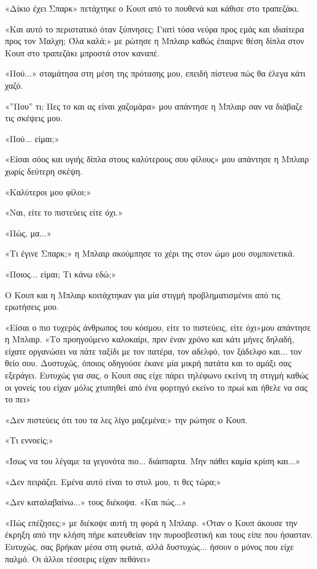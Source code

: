 \documentclass[12pt,twoside, openany]{book}
\begin{document}
«Δίκιο έχει Σπαρκ» πετάχτηκε ο Κουπ από το πουθενά και κάθισε στο τραπεζάκι.

«Και αυτό το περιστατικό όταν ξύπνησες; Γιατί τόσα νεύρα προς εμάς και ιδιαίτερα προς τον Μαλχη; Όλα καλά;» με ρώτησε η Μπλαιρ καθώς έπαιρνε θέση δίπλα στον Κουπ στο τραπεζάκι μπροστά στον καναπέ.

«Πού...» σταμάτησα στη μέση της πρότασης μου, επειδή πίστευα πώς θα έλεγα κάτι χαζό.

«”Που” τι; Πες το και ας είναι χαζομάρα» μου απάντησε η Μπλαιρ σαν να διάβαζε τις σκέψεις μου.

«Πού... είμαι;»

«Είσαι σόος και υγιής δίπλα στους καλύτερους σου φίλους» μου απάντησε η Μπλαιρ χωρίς δεύτερη σκέψη.

«Καλύτεροι μου φίλοι;»

«Ναι, είτε το πιστεύεις είτε όχι.»

«Πώς, μα...»

«Τι έγινε Σπαρκ;» η Μπλαιρ ακούμπησε το χέρι της στον ώμο μου συμπονετικά. 

«Ποιος... είμαι; Τι κάνω εδώ;»

Ο Κουπ και η Μπλαιρ κοιτάχτηκαν για μία στιγμή προβληματισμένοι από τις ερωτήσεις μου.

«Είσαι ο πιο τυχερός άνθρωπος του κόσμου, είτε το πιστεύεις, είτε όχι»μου απάντησε η Μπλαιρ. «Το προηγούμενο καλοκαίρι, πριν έναν χρόνο και κάτι μήνες δηλαδή, είχατε οργανώσει να πάτε ταξίδι με τον πατέρα, τον αδελφό, τον ξάδελφο και... τον θείο σου. Δυστυχώς, όποιος οδηγούσε έκανε μία μικρή πατάτα και το αμάξι σας εξεράγει. Ευτυχώς για σας, ο Κουπ σας είχε πάρει τηλέφωνο εκείνη τη στιγμή καθώς οι γονείς του είχαν μόλις χτυπηθεί από ένα φορτηγό εκείνο το πρωί και ήθελε να σας το πει»

«Δεν πιστεύεις ότι του τα λες λίγο μαζεμένα;» την ρώτησε ο Κουπ.

«Τι εννοείς;»

«Ίσως να του λέγαμε τα γεγονότα πιο... διάσπαρτα. Μην πάθει καμία κρίση και...»

«Δεν πειράζει. Εμένα αυτό είναι το στυλ μου, τι θες τώρα;»

«Δεν καταλαβαίνω...» τους διέκοψα. «Και πώς...»

«Πώς επέζησες;» με διέκοψε αυτή τη φορά η Μπλαιρ. «Όταν ο Κουπ άκουσε την έκρηξη από την κλήση πήρε κατευθείαν την πυροσβεστική και τους είπε που ήσασταν. Ευτυχώς, σας βρήκαν μέσα στη φωτιά, αλλά δυστυχώς... ήσουν ο μόνος που είχε παλμό. Οι άλλοι τέσσερις είχαν πεθάνει»
\end{document}
